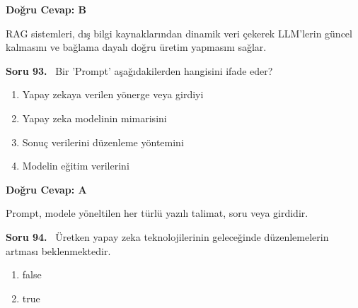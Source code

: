 \documentclass[11pt,a4paper,openany]{book}
\begin{document}
\vspace{4pt}
\begin{tcolorbox}[title=Cevap ve Açıklama, colback=gray!3!white, colframe=primarycolor!90!black, arc=2mm, fonttitle=\bfseries\sffamily, top=6pt, bottom=6pt]
    \textbf{Doğru Cevap: B}
    
    \vspace{2pt}
    RAG sistemleri, dış bilgi kaynaklarından dinamik veri çekerek LLM'lerin güncel kalmasını ve bağlama dayalı doğru üretim yapmasını sağlar.
\end{tcolorbox}
\vspace{10pt}
\needspace{5cm}
\vspace{8pt}
\noindent\textbf{\large\sffamily Soru 93.} \ Bir 'Prompt' aşağıdakilerden hangisini ifade eder?

\begin{enumerate}[label=\Alph*), leftmargin=25pt, topsep=4pt, itemsep=2pt]
        \item Yapay zekaya verilen yönerge veya girdiyi
        \item Yapay zeka modelinin mimarisini
        \item Sonuç verilerini düzenleme yöntemini
        \item Modelin eğitim verilerini
\end{enumerate}

\vspace{4pt}
\begin{tcolorbox}[title=Cevap ve Açıklama, colback=gray!3!white, colframe=primarycolor!90!black, arc=2mm, fonttitle=\bfseries\sffamily, top=6pt, bottom=6pt]
    \textbf{Doğru Cevap: A}
    
    \vspace{2pt}
    Prompt, modele yöneltilen her türlü yazılı talimat, soru veya girdidir.
\end{tcolorbox}
\vspace{10pt}
\needspace{5cm}
\vspace{8pt}
\noindent\textbf{\large\sffamily Soru 94.} \ Üretken yapay zeka teknolojilerinin geleceğinde düzenlemelerin artması beklenmektedir.

\begin{enumerate}[label=\Alph*), leftmargin=25pt, topsep=4pt, itemsep=2pt]
        \item false
        \item true
\end{enumerate}
\end{document}

